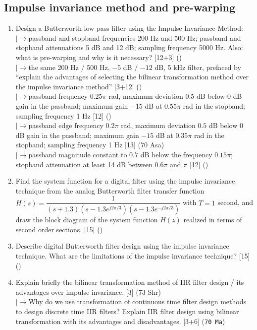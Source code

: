 \documentclass[12pt]{article}
\newcommand{\lb}{\\$\left|\rightarrow\right.$}
\begin{document}
  \subsection{Impulse invariance method and pre-warping}
    \begin{enumerate}[topsep=0pt, noitemsep]
      \item Design a Butterworth low pass filter using the Impulse Invariance Method:
        \lb passband and stopband frequencies 200 Hz and 500 Hz; passband and stopband attenuations 5 dB and 12 dB; sampling frequency 5000 Hz. Also: what is pre-warping and why is it necessary? \hfill [12+3] ()
        \lb the same 200 Hz / 500 Hz, $-5$ dB / $-12$ dB, 5 kHz filter, prefaced by ``explain the advantages of selecting the bilinear transformation method over the impulse invariance method'' \hfill [3+12] ()
        \lb passband frequency $0.25\pi$ rad, maximum deviation $0.5$ dB below 0 dB gain in the passband; maximum gain $-15$ dB at $0.55\pi$ rad in the stopband; sampling frequency 1 Hz \hfill [12] ()
        \lb passband edge frequency $0.2\pi$ rad, maximum deviation $0.5$ dB below 0 dB gain in the passband; maximum gain $-15$ dB at $0.35\pi$ rad in the stopband; sampling frequency 1 Hz \hfill [13] (70 Asa)
        \lb passband magnitude constant to $0.7$ dB below the frequency $0.15\pi$; stopband attenuation at least 14 dB between $0.6\pi$ and $\pi$ \hfill [12] ()

      \item Find the system function for a digital filter using the impulse invariance technique from the analog Butterworth filter transfer function
        $H(s)=\dfrac{1}{(s+1.3)(s-1.3e^{j2\pi/3})(s-1.3e^{-j2\pi/3})}$ with $T=1$ second, and draw the block diagram of the system function $H(z)$ realized in terms of second order sections. \hfill [15] ()

      \item Describe digital Butterworth filter design using the impulse invariance technique. What are the limitations of the impulse invariance technique? \hfill [15] ()

      \item Explain briefly the bilinear transformation method of IIR filter design / its advantages over impulse invariance. \hfill [3] (73 Shr)
        \lb Why do we use transformation of continuous time filter design methods to design discrete time IIR filters? Explain IIR filter design using bilinear transformation with its advantages and disadvantages. \hfill [3+6] (\texttt{70 Ma})
    \end{enumerate}
\end{document}
